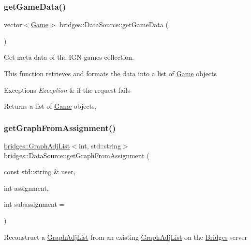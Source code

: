 \subsubsection{\texorpdfstring{get\+Game\+Data()}{getGameData()}}
{\footnotesize\ttfamily vector$<$\mbox{\hyperlink{classbridges_1_1_game}{Game}}$>$ bridges\+::\+Data\+Source\+::get\+Game\+Data (\begin{DoxyParamCaption}{ }\end{DoxyParamCaption})\hspace{0.3cm}{\ttfamily [inline]}}

Get meta data of the I\+GN games collection.

This function retrieves and formats the data into a list of \mbox{\hyperlink{classbridges_1_1_game}{Game}} objects


\begin{DoxyExceptions}{Exceptions}
{\em Exception} & if the request fails\\
\hline
\end{DoxyExceptions}
\begin{DoxyReturn}{Returns}
a list of \mbox{\hyperlink{classbridges_1_1_game}{Game}} objects, 
\end{DoxyReturn}
\mbox{\label{classbridges_1_1_data_source_ac4edf55c163c60f17b13f5499e5d2e65}} 
\subsubsection{\texorpdfstring{get\+Graph\+From\+Assignment()}{getGraphFromAssignment()}}
{\footnotesize\ttfamily \mbox{\hyperlink{classbridges_1_1_graph_adj_list}{bridges\+::\+Graph\+Adj\+List}}$<$int, std\+::string$>$ bridges\+::\+Data\+Source\+::get\+Graph\+From\+Assignment (\begin{DoxyParamCaption}\item[{const std\+::string \&}]{user,  }\item[{int}]{assignment,  }\item[{int}]{subassignment = {} }\end{DoxyParamCaption})\hspace{0.3cm}{\ttfamily [inline]}}

Reconstruct a \mbox{\hyperlink{classbridges_1_1_graph_adj_list}{Graph\+Adj\+List}} from an existing \mbox{\hyperlink{classbridges_1_1_graph_adj_list}{Graph\+Adj\+List}} on the \mbox{\hyperlink{classbridges_1_1_bridges}{Bridges}} server

